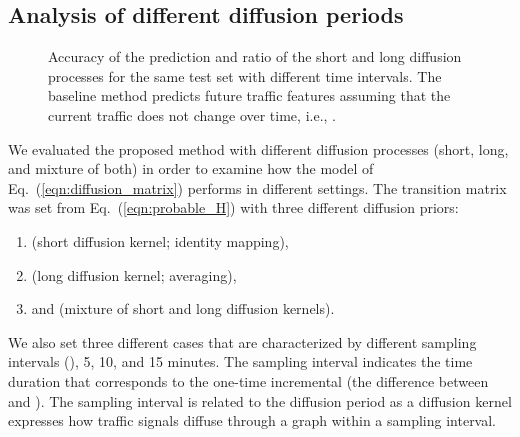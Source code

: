 \documentclass[journal]{IEEEtran}
\begin{document}
\subsection{Analysis of different diffusion periods}\label{sec:different_diffusion_periods}
\begin{figure*}[!ht]    
   \centering
   \hfill
   \hfill
   \hfill
   \hfill
   \caption{Accuracy of the prediction and ratio of the short and long diffusion processes for the same test set with different time intervals.
   The baseline method predicts future traffic features assuming that the current traffic does not change over time, i.e., .
   }\label{fig:rmse_performance_long_short}
\end{figure*}
We evaluated the proposed method with different diffusion processes (short, long, and mixture of both) in order to examine how the model of Eq.~(\ref{eqn:diffusion_matrix}) performs in different settings. The transition matrix  was set from Eq.~(\ref{eqn:probable_H}) with three different diffusion priors:
\begin{enumerate}
  \item  (short diffusion kernel; identity mapping),
  \item  (long diffusion kernel; averaging),
  \item and  (mixture of short and long diffusion kernels).
\end{enumerate}

We also set three different cases that are characterized by different sampling intervals (), 5, 10, and 15 minutes. 
The sampling interval indicates the time duration that corresponds to the one-time incremental (the difference between  and ). 
The sampling interval is related to the diffusion period  as a diffusion kernel expresses how traffic signals diffuse through a graph within a sampling interval.
\end{document}
